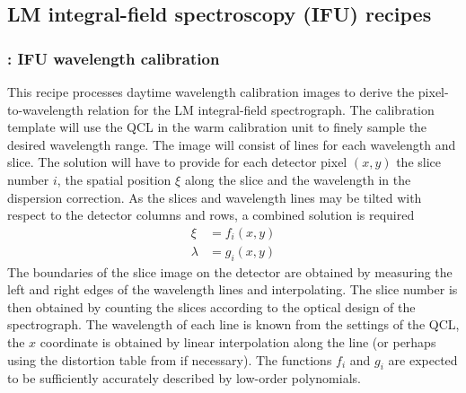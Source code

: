 
\clearpage
\subsection{LM integral-field spectroscopy (IFU) recipes}
\label{ssec:IFU_recipes}


\subsubsection{: IFU wavelength calibration}
\label{sssec:ifu_wavecal}
\label{rec:metis_ifu_wavecal}

This recipe processes daytime wavelength calibration images to derive
the pixel-to-wavelength relation for the LM integral-field
spectrograph. The calibration template will use the \ac{QCL} in the warm calibration unit to finely sample the desired
wavelength range. The image will consist of lines for each wavelength
and slice. The solution will have to provide for each detector pixel
$(x,y)$ the slice number $i$, the spatial position $\xi$ along the
slice and the wavelength in the dispersion correction. As the slices
and wavelength lines may be tilted with respect to the detector
columns and rows, a combined solution is required
\begin{align}
  \label{eq:wavelength_solution}
  \xi &= f_{i}(x, y) \\
  \lambda &= g_{i}(x, y)
\end{align}
The boundaries of the slice image on the detector are obtained by
measuring the left and right edges of the wavelength lines and
interpolating. The slice number is then obtained by counting the
slices according to the optical design of the spectrograph. The
wavelength of each line is known from the settings of the \ac{QCL}, the $x$
coordinate is obtained by linear interpolation along the line (or
perhaps using the distortion table from \hyperref[rec:metis_ifu_distortion]{} if
necessary). The functions $f_{i}$ and $g_{i}$ are expected to be
sufficiently accurately described by low-order polynomials.

